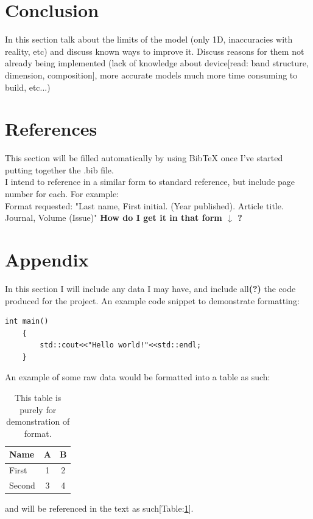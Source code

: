 \documentclass[titlepage]{article}
\begin{document}
\section{Conclusion}
In this section talk about the limits of the model (only 1D, inaccuracies with reality, etc) and discuss known ways to improve it. Discuss reasons for them not already being implemented (lack of knowledge about device[read: band structure, dimension, composition], more accurate models much more time consuming to build, etc...) \\


\section{References}
This section will be filled automatically by using BibTeX once I've started putting together the .bib file.\\
I intend to reference in a similar form to standard reference, but include page number for each. For example:\\
\medbreak
Format requested: "Last name, First initial. (Year published). Article title. Journal, Volume (Issue)" \textbf{How do I get it in that form $\downarrow$ ?}
{}

\bigskip

\section{Appendix}
In this section I will include any data I may have, and include all\textbf{(?)} the code produced for the project. An example code snippet to demonstrate formatting:\smallskip
\begin{lstlisting}[caption = Hello world example code.]
	int main()
	{
		std::cout<<"Hello world!"<<std::endl;
	}
\end{lstlisting}
\medskip
An example of some raw data would be formatted into a table as such:\\
\begin{table}[h]
	\centering
	\begin{tabular}{|l|c|c|}
		\hline
		\textbf{Name} & \textbf{A} & \textbf{B} \\
		\hline
		First & 1 & 2 \\
		Second & 3 & 4 \\
		\hline
	\end{tabular}
	\caption{\label{tab:appendixTest} This table is purely for demonstration of format.}
\end{table}
and will be referenced in the text as such[Table:\ref{tab:appendixTest}].
\end{document}
